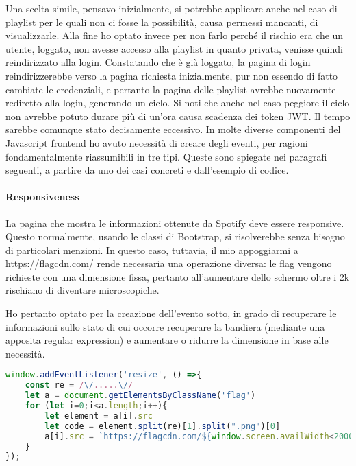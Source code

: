 Una scelta simile, pensavo inizialmente, si potrebbe applicare anche nel caso di playlist per le quali non ci fosse la possibilità, causa permessi mancanti, di visualizzarle. Alla fine ho optato invece per non farlo perché il rischio era che un utente, loggato, non avesse accesso alla playlist in quanto privata, venisse quindi reindirizzato alla login. Constatando che è già loggato, la pagina di login reindirizzerebbe verso la pagina richiesta inizialmente, pur non essendo di fatto cambiate le credenziali, e pertanto la pagina delle playlist avrebbe nuovamente rediretto alla login, generando un ciclo.
\alert{Si noti che anche nel caso peggiore il ciclo non avrebbe potuto durare più di un'ora causa scadenza dei token JWT. Il tempo sarebbe comunque stato decisamente eccessivo.}
In molte diverse componenti del Javascript frontend ho avuto necessità di creare degli eventi, per ragioni fondamentalmente riassumibili in tre tipi. Queste sono spiegate nei paragrafi seguenti, a partire da uno dei casi concreti e dall'esempio di codice.
\paragraph{Responsiveness} La pagina che mostra le informazioni ottenute da Spotify deve essere responsive. Questo normalmente, usando le classi di Bootstrap, si risolverebbe senza bisogno di particolari menzioni. In questo caso, tuttavia, il mio appoggiarmi a \href{https://flagcdn.com/}{https://flagcdn.com/} rende necessaria una operazione diversa: le flag vengono richieste con una dimensione fissa, pertanto all'aumentare dello schermo oltre i 2k rischiano di diventare microscopiche.

Ho pertanto optato per la creazione dell'evento sotto, in grado di recuperare le informazioni sullo stato di cui occorre recuperare la bandiera (mediante una apposita regular expression) e aumentare o ridurre la dimensione in base alle necessità.
\begin{lstlisting}[language=JavaScript]
window.addEventListener('resize', () =>{
    const re = /\/.....\//
    let a = document.getElementsByClassName('flag')
    for (let i=0;i<a.length;i++){
        let element = a[i].src
        let code = element.split(re)[1].split(".png")[0]
        a[i].src = `https://flagcdn.com/${window.screen.availWidth<2000?"16x12":"64x48"}/${code}.png`
    }
});
\end{lstlisting}
